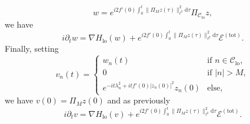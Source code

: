 \documentclass[JEP,XML,SOM,Unicode,published]{cedram}
\theoremstyle{plain}
\theoremstyle{definition}
\DeclareMathOperator{\lo}{lo}
\newcommand{\1}{\mathbf{1}}
\newcommand{\Clo}{\mathscr{C}_{\lo}}
\begin{document}
\[
w = e^{i 2f'(0) \int_0^t \| \Pi_{M} z(\tau) \|_{\ell^2}^2 \mathrm{d}\tau} \Pi_{\Clo} z,
\]
we have
\begin{equation*}
\label{eq:onw}
i\partial_t w = \nabla H_{\lo}(w) + e^{i 2f'(0) \int_0^t \| \Pi_{M} z(\tau) \|_{\ell^2}^2 \mathrm{d}\tau} \mathcal{E}^{\mathrm{(tot)}}.
\end{equation*}
Finally, setting
\begin{equation}
\label{eq:tensorise}
v_n(t) =
\begin{cases}
w_n(t) & \text{if } n\in \Clo, \\
0 &\text{if } |n|>M,\\
e^{-it \lambda_n^2 + i tf'(0) |z_n(0)|^2} z_n(0) & \text{else},
\end{cases}
\end{equation}
we have $v(0) = \Pi_M z(0)$ and as previously
\begin{equation}
\label{eq:onv}
i\partial_t v = \nabla H_{\lo}(v) + e^{i 2f'(0) \int_0^t \| \Pi_{M} z(\tau) \|_{\ell^2}^2 \mathrm{d}\tau} \mathcal{E}^{\mathrm{(tot)}}.
\end{equation}
\end{document}
